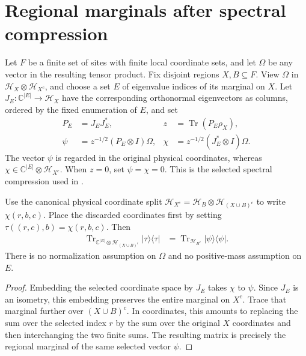 \section{Regional marginals after spectral compression}
\label{sec:compressed_typical_regional_marginal}

Let $F$ be a finite set of sites with finite local coordinate sets, and
let $\Omega$ be any vector in the resulting tensor product. Fix disjoint
regions $X,B\subseteq F$. View $\Omega$ in
$\mathcal H_X\otimes\mathcal H_{X^c}$, and choose a set $E$ of
eigenvalue indices of its marginal on $X$. Let
$J_E:\mathbb C^{|E|}\to\mathcal H_X$ have the corresponding
orthonormal eigenvectors as columns, ordered by the fixed enumeration of
$E$, and set
\begin{align}
 P_E&=J_EJ_E^*,
 &z&=\operatorname{Tr}(P_E\rho_X),\\
 \psi&=z^{-1/2}(P_E\otimes I)\Omega,
 &\chi&=z^{-1/2}(J_E^*\otimes I)\Omega.
\end{align}
The vector $\psi$ is regarded in the original physical coordinates,
whereas $\chi\in\mathbb C^{|E|}\otimes\mathcal H_{X^c}$.
When $z=0$, set $\psi=\chi=0$. This is the
selected spectral compression used in
\cite[Section~7]{OpenAI2026AreaLaw}.

\begin{theorem}
\label{thm:compressed_typical_regional_marginal}
\leanok
{}
Use the canonical physical coordinate split
$\mathcal H_{X^c}=\mathcal H_B\otimes\mathcal H_{(X\cup B)^c}$
to write $\chi(r,b,c)$. Place the discarded coordinates first by setting
$\tau((r,c),b)=\chi(r,b,c)$. Then
\begin{align}
 \operatorname{Tr}_{\mathbb C^{|E|}\otimes\mathcal H_{(X\cup B)^c}}
       |\tau\rangle\langle\tau|
 &=\operatorname{Tr}_{\mathcal H_{B^c}}|\psi\rangle\langle\psi|.
\end{align}
There is no normalization assumption on $\Omega$ and no positive-mass
assumption on $E$.
\end{theorem}
\begin{proof}
\leanok
Embedding the selected coordinate space by $J_E$ takes $\chi$ to
$\psi$. Since $J_E$ is an isometry, this embedding preserves the entire
marginal on $X^c$. Trace that marginal further over $(X\cup B)^c$.
In coordinates, this amounts to replacing the sum over the selected
index $r$ by the sum over the original $X$ coordinates and then
interchanging the two finite sums. The resulting matrix is precisely the
regional marginal of the same selected vector $\psi$.
\end{proof}


